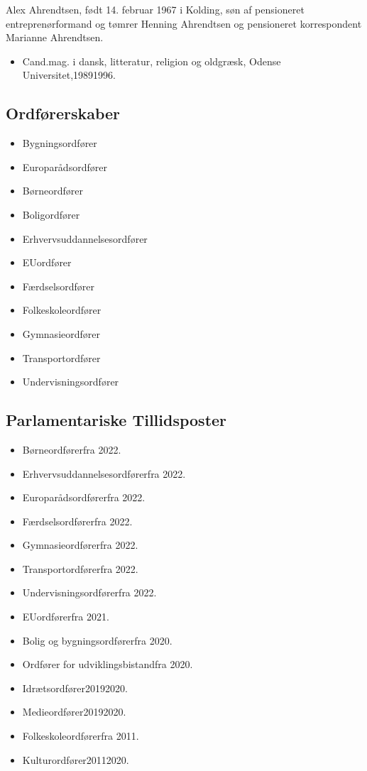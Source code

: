 \documentclass[11pt, a4paper]{awesome-cv}
\begin{document}
\makecvheader[R]
\makelettertitle
\begin{cvletter}
Alex Ahrendtsen, født 14. februar 1967 i Kolding, søn af pensioneret entreprenørformand og tømrer Henning Ahrendtsen og pensioneret korrespondent Marianne Ahrendtsen.

\begin{itemize}
\item Cand.mag. i dansk, litteratur, religion og oldgræsk, Odense Universitet,19891996.
\end{itemize}
\subsection*{Ordførerskaber}
\begin{itemize}
\item Bygningsordfører
\item Europarådsordfører
\item Børneordfører
\item Boligordfører
\item Erhvervsuddannelsesordfører
\item EUordfører
\item Færdselsordfører
\item Folkeskoleordfører
\item Gymnasieordfører
\item Transportordfører
\item Undervisningsordfører
\end{itemize}
\subsection*{Parlamentariske Tillidsposter}
\begin{itemize}
\item Børneordførerfra 2022.
\item Erhvervsuddannelsesordførerfra 2022.
\item Europarådsordførerfra 2022.
\item Færdselsordførerfra 2022.
\item Gymnasieordførerfra 2022.
\item Transportordførerfra 2022.
\item Undervisningsordførerfra 2022.
\item EUordførerfra 2021.
\item Bolig og bygningsordførerfra 2020.
\item Ordfører for udviklingsbistandfra 2020.
\item Idrætsordfører20192020.
\item Medieordfører20192020.
\item Folkeskoleordførerfra 2011.
\item Kulturordfører20112020.
\end{itemize}

\end{cvletter}
\end{document}

